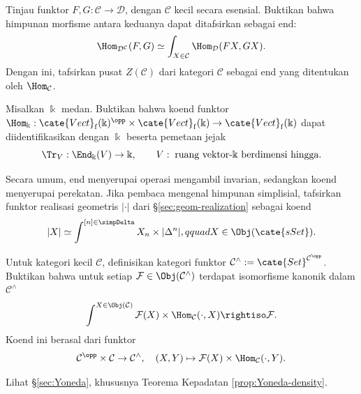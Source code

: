 \begin{Exercises}
	\item Tinjau funktor $F,G:\mathcal{C}\to\mathcal{D}$, dengan
	$\mathcal{C}$ kecil secara esensial. Buktikan bahwa himpunan morfisme
	antara keduanya dapat ditafsirkan sebagai end:
	\[ \Hom_{\mathcal{D}^{\mathcal{C}}}(F,G)\simeq
	\int_{X\in\mathcal{C}}\Hom_{\mathcal{D}}(FX,GX). \]
	Dengan ini, tafsirkan pusat $Z(\mathcal{C})$ dari kategori $\mathcal{C}$
	sebagai end yang ditentukan oleh $\Hom_{\mathcal{C}}$.

	\item Misalkan $\Bbbk$ medan. Buktikan bahwa koend funktor
	$\Hom_{\Bbbk}:\cate{Vect}_{\mathrm f}(\Bbbk)^{\opp}\times
	\cate{Vect}_{\mathrm f}(\Bbbk)\to\cate{Vect}_{\mathrm f}(\Bbbk)$
	dapat diidentifikasikan dengan $\Bbbk$ beserta pemetaan jejak
	\[ \Tr_V:\End_{\Bbbk}(V)\to\Bbbk,\qquad
	V:\;\text{ruang vektor-$\Bbbk$ berdimensi hingga}. \]

	\item Secara umum, end menyerupai operasi mengambil invarian, sedangkan
	koend menyerupai perekatan. Jika pembaca mengenal himpunan
	simplisial, tafsirkan funktor realisasi geometris $|\mathord\cdot|$ dari
	\S\ref{sec:geom-realization} sebagai koend
	\[ |X|\simeq\int^{[n]\in\simpDelta}X_n\times|\Delta^n|,qquad
	X\in\Obj(\cate{sSet}). \]

	\item Untuk kategori kecil $\mathcal{C}$, definisikan kategori funktor
	$\mathcal{C}^\wedge:=\cate{Set}^{\mathcal{C}^{\opp}}$. Buktikan bahwa
	untuk setiap $\mathcal{F}\in\Obj(\mathcal{C}^\wedge)$ terdapat
	isomorfisme kanonik dalam $\mathcal{C}^\wedge$
	\[ \int^{X\in\Obj(\mathcal{C})}\mathcal{F}(X)\times
	\Hom_{\mathcal{C}}(\cdot,X)\rightiso\mathcal{F}. \]
	Koend ini berasal dari funktor
	\[ \mathcal{C}^{\opp}\times\mathcal{C}\to\mathcal{C}^\wedge,
	\quad(X,Y)\mapsto\mathcal{F}(X)\times\Hom_{\mathcal{C}}(\cdot,Y). \]
	\begin{hint}
		Lihat \S\ref{sec:Yoneda}, khususnya Teorema Kepadatan
		\ref{prop:Yoneda-density}.
	\end{hint}


\end{Exercises}
